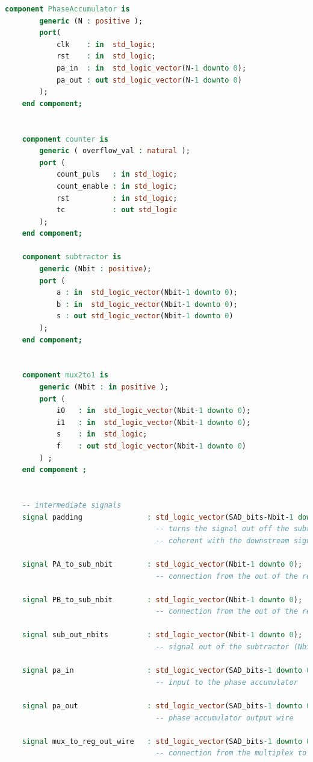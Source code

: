 \documentclass[12pt, a4paper]{article}
\begin{document}
\begin{appendices}
\begin{lstlisting}[language=vhdl]
	component PhaseAccumulator is
		generic (N : positive );
		port(
			clk    : in  std_logic;
			rst    : in  std_logic;
			pa_in  : in  std_logic_vector(N-1 downto 0);
			pa_out : out std_logic_vector(N-1 downto 0)
		);
	end component;


	component counter is
		generic ( overflow_val : natural );
		port (
			count_puls   : in std_logic;
			count_enable : in std_logic;
			rst          : in std_logic;
			tc           : out std_logic
		);
	end component;

	component subtractor is
		generic (Nbit : positive);
		port (
			a : in  std_logic_vector(Nbit-1 downto 0);
			b : in  std_logic_vector(Nbit-1 downto 0);
			s : out std_logic_vector(Nbit-1 downto 0) 
		);
	end component;


	component mux2to1 is
		generic (Nbit : in positive );
		port (
			i0   : in  std_logic_vector(Nbit-1 downto 0);
			i1   : in  std_logic_vector(Nbit-1 downto 0);
			s    : in  std_logic;
			f    : out std_logic_vector(Nbit-1 downto 0)
		) ;
	end component ;


	-- intermediate signals
	signal padding               : std_logic_vector(SAD_bits-Nbit-1 downto 0); 
                                   -- turns the signal out off the subractor to a number of bits 
                                   -- coherent with the downstream signal

	signal PA_to_sub_nbit        : std_logic_vector(Nbit-1 downto 0);          
                                   -- connection from the out of the reg on the PA side to the subtractor

	signal PB_to_sub_nbit        : std_logic_vector(Nbit-1 downto 0);          
                                   -- connection from the out of the reg on the PB side to the subtractor

	signal sub_out_nbits         : std_logic_vector(Nbit-1 downto 0); 
                                   -- signal out of the subtractor (Nbit)

	signal pa_in                 : std_logic_vector(SAD_bits-1 downto 0);
                                   -- input to the phase accumulator

	signal pa_out                : std_logic_vector(SAD_bits-1 downto 0); 
                                   -- phase accumulator output wire
	
	signal mux_to_reg_out_wire   : std_logic_vector(SAD_bits-1 downto 0);
                                   -- connection from the multiplex to the output PIPO register
	

\end{lstlisting}
\end{appendices}
\end{document}
